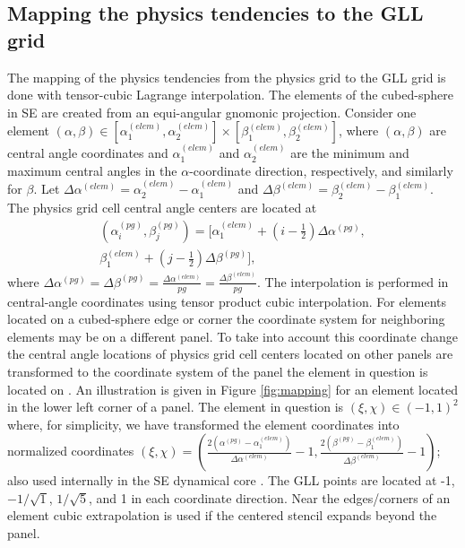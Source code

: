 %

\subsection{Mapping the physics tendencies to the GLL grid}\label{sec:app0}
The mapping of the physics tendencies from the physics grid to the GLL grid is done with tensor-cubic Lagrange interpolation. The elements of the cubed-sphere in SE are created from an equi-angular gnomonic projection. Consider one element $(\alpha,\beta) \in \left[ \alpha^{(elem)}_1,\alpha^{(elem)}_2 \right]\times \left[ \beta^{(elem)}_1,\beta^{(elem)}_2\right]$, where $(\alpha,\beta)$ are central angle coordinates and $\alpha^{(elem)}_1$ and $\alpha^{(elem)}_2$ are the minimum and maximum central angles in the $\alpha$-coordinate direction, respectively, and similarly for $\beta$. Let $\Delta \alpha^{(elem)}=\alpha^{(elem)}_2-\alpha^{(elem)}_1$ and $\Delta \beta^{(elem)}=\beta^{(elem)}_2-\beta^{(elem)}_1$. The physics grid cell central angle centers are located at
\begin{multline}
(\alpha^{(pg)}_i,\beta^{(pg)}_j)= \Big[ \alpha^{(elem)}_1+\left(i-\tfrac{1}{2}\right) \Delta \alpha^{(pg)},\\
                                      \beta^{(elem)}_1+\left(j-\tfrac{1}{2}\right) \Delta \beta^{(pg)}\Big],
\end{multline}
where $\Delta \alpha^{(pg)}=\Delta \beta^{(pg)}=\frac{\Delta \alpha^{(elem)}}{pg}=\frac{\Delta \beta^{(elem)}}{pg}$. The interpolation is performed in central-angle coordinates using tensor product cubic interpolation. For elements located on a cubed-sphere edge or corner the coordinate system for neighboring elements may be on a different panel. To take into account this coordinate change the central angle locations of physics grid cell centers located on other panels are transformed to the coordinate system of the panel the element in question is located on \cite[the transformations are given in, e.g.,  ][]{NTL2005MWRb}. An illustration is given in Figure \ref{fig:mapping} for an element located in the lower left corner of a panel. The element in question is $(\xi,\chi)\in (-1,1)^2$ where, for simplicity, we have transformed the element coordinates into normalized coordinates $(\xi,\chi) = \left( \frac{ 2\left(\alpha^{(pg)}-\alpha^{(elem)}_1\right)}{\Delta \alpha^{(elem)}}-1,\frac{2\left( \beta^{(pg)}-\beta^{(elem)}_1\right)}{\Delta \beta^{(elem)}}-1\right)$; also used internally in the SE dynamical core \citep[see, e.g., section 3.3 in ][]{LetAl2018JAMES}. The GLL points are located at -1,$-1/\sqrt{1}$, $1/\sqrt{5}$, and 1 in each coordinate direction. Near the edges/corners of an element cubic extrapolation is used if the centered stencil expands beyond the panel.

